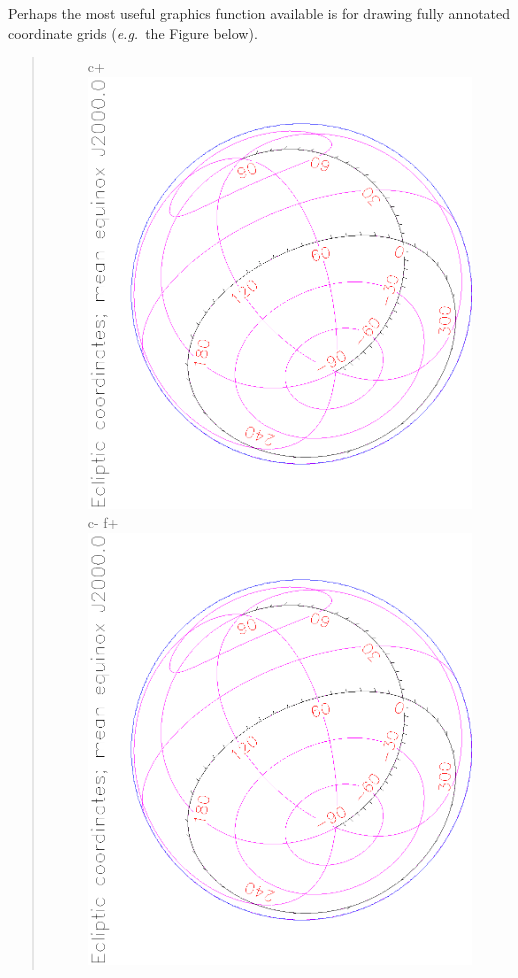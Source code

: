 \documentclass[twoside,11pt]{article}
\begin{document}
\begin{htmlonly}
   Perhaps the most useful graphics function available is for drawing
   fully annotated coordinate grids ({\em{e.g.}}\ the Figure below).
   \begin{quote}
   \begin{figure}
   \label{fig:gridplot}
c+
   \includegraphics[scale=1.2,angle=-90]{sun211_figures/gridplot.eps}
c-
f+
   \includegraphics[scale=1.2,angle=-90]{sun210_figures/gridplot.eps}

\end{figure}
\end{quote}
\end{htmlonly}
\end{document}
